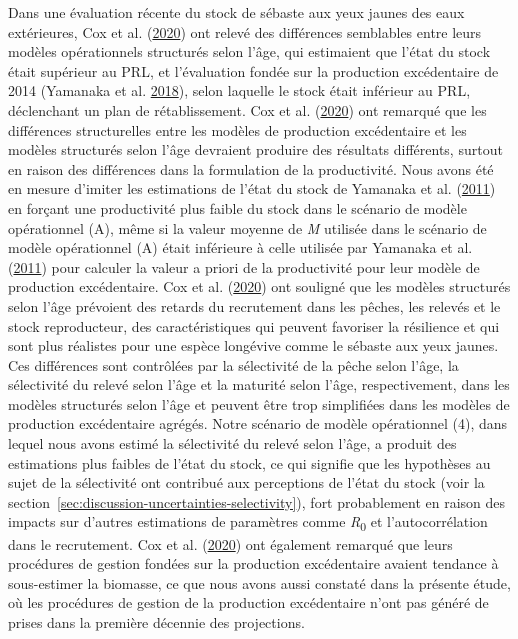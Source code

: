 \documentclass[french,11pt]{book}
\begin{document}
Dans une évaluation récente du stock de sébaste aux yeux jaunes des eaux extérieures, Cox et al. (\protect\hyperlink{ref-cox2020}{2020}) ont relevé des différences semblables entre leurs modèles opérationnels structurés selon l'âge, qui estimaient que l'état du stock était supérieur au PRL, et l'évaluation fondée sur la production excédentaire de 2014 (Yamanaka et al. \protect\hyperlink{ref-yamanaka2018yelloweyeoutside}{2018}), selon laquelle le stock était inférieur au PRL, déclenchant un plan de rétablissement. Cox et al. (\protect\hyperlink{ref-cox2020}{2020}) ont remarqué que les différences structurelles entre les modèles de production excédentaire et les modèles structurés selon l'âge devraient produire des résultats différents, surtout en raison des différences dans la formulation de la productivité. Nous avons été en mesure d'imiter les estimations de l'état du stock de Yamanaka et al. (\protect\hyperlink{ref-yamanaka2011}{2011}) en forçant une productivité plus faible du stock dans le scénario de modèle opérationnel (A), même si la valeur moyenne de \emph{M} utilisée dans le scénario de modèle opérationnel (A) était inférieure à celle utilisée par Yamanaka et al. (\protect\hyperlink{ref-yamanaka2011}{2011}) pour calculer la valeur a priori de la productivité pour leur modèle de production excédentaire. Cox et al. (\protect\hyperlink{ref-cox2020}{2020}) ont souligné que les modèles structurés selon l'âge prévoient des retards du recrutement dans les pêches, les relevés et le stock reproducteur, des caractéristiques qui peuvent favoriser la résilience et qui sont plus réalistes pour une espèce longévive comme le sébaste aux yeux jaunes. Ces différences sont contrôlées par la sélectivité de la pêche selon l'âge, la sélectivité du relevé selon l'âge et la maturité selon l'âge, respectivement, dans les modèles structurés selon l'âge et peuvent être trop simplifiées dans les modèles de production excédentaire agrégés. Notre scénario de modèle opérationnel (4), dans lequel nous avons estimé la sélectivité du relevé selon l'âge, a produit des estimations plus faibles de l'état du stock, ce qui signifie que les hypothèses au sujet de la sélectivité ont contribué aux perceptions de l'état du stock (voir la section~\ref{sec:discussion-uncertainties-selectivity}), fort probablement en raison des impacts sur d'autres estimations de paramètres comme \emph{R}\textsubscript{0} et l'autocorrélation dans le recrutement. Cox et al. (\protect\hyperlink{ref-cox2020}{2020}) ont également remarqué que leurs procédures de gestion fondées sur la production excédentaire avaient tendance à sous-estimer la biomasse, ce que nous avons aussi constaté dans la présente étude, où les procédures de gestion de la production excédentaire n'ont pas généré de prises dans la première décennie des projections.
\end{document}
